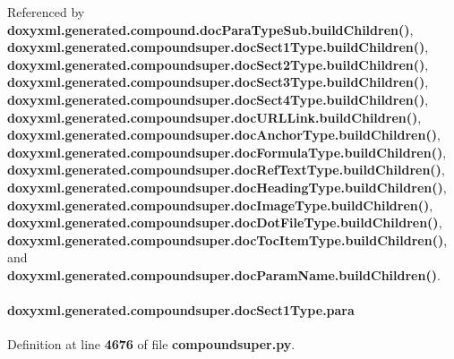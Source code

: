 Referenced by {\bf doxyxml.\+generated.\+compound.\+doc\+Para\+Type\+Sub.\+build\+Children()}, {\bf doxyxml.\+generated.\+compoundsuper.\+doc\+Sect1\+Type.\+build\+Children()}, {\bf doxyxml.\+generated.\+compoundsuper.\+doc\+Sect2\+Type.\+build\+Children()}, {\bf doxyxml.\+generated.\+compoundsuper.\+doc\+Sect3\+Type.\+build\+Children()}, {\bf doxyxml.\+generated.\+compoundsuper.\+doc\+Sect4\+Type.\+build\+Children()}, {\bf doxyxml.\+generated.\+compoundsuper.\+doc\+U\+R\+L\+Link.\+build\+Children()}, {\bf doxyxml.\+generated.\+compoundsuper.\+doc\+Anchor\+Type.\+build\+Children()}, {\bf doxyxml.\+generated.\+compoundsuper.\+doc\+Formula\+Type.\+build\+Children()}, {\bf doxyxml.\+generated.\+compoundsuper.\+doc\+Ref\+Text\+Type.\+build\+Children()}, {\bf doxyxml.\+generated.\+compoundsuper.\+doc\+Heading\+Type.\+build\+Children()}, {\bf doxyxml.\+generated.\+compoundsuper.\+doc\+Image\+Type.\+build\+Children()}, {\bf doxyxml.\+generated.\+compoundsuper.\+doc\+Dot\+File\+Type.\+build\+Children()}, {\bf doxyxml.\+generated.\+compoundsuper.\+doc\+Toc\+Item\+Type.\+build\+Children()}, and {\bf doxyxml.\+generated.\+compoundsuper.\+doc\+Param\+Name.\+build\+Children()}.

\paragraph[{para}]{\setlength{\rightskip}{0pt plus 5cm}doxyxml.\+generated.\+compoundsuper.\+doc\+Sect1\+Type.\+para}\label{classdoxyxml_1_1generated_1_1compoundsuper_1_1docSect1Type_ae565ac4435bca166436c910412d530e2}


Definition at line {\bf 4676} of file {\bf compoundsuper.\+py}.



